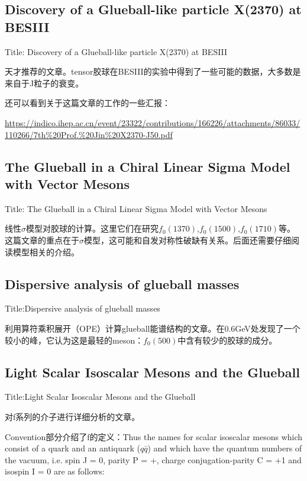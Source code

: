 \documentclass{article}
\begin{document}
\subsection{Discovery of a Glueball-like particle X(2370) at BESIII}

Title: Discovery of a Glueball-like particle X(2370) at BESIII \cite{huang2025discoveryglueballlikeparticlex2370}

天才推荐的文章。tensor胶球在BESIII的实验中得到了一些可能的数据，大多数是来自于J粒子的衰变。


还可以看到关于这篇文章的工作的一些汇报：

\url{https://indico.ihep.ac.cn/event/23322/contributions/166226/attachments/86033/110266/7th%20Prof.%20Jin%20X2370-J50.pdf}








\subsection{The Glueball in a Chiral Linear Sigma Model with Vector Mesons}

Title: The Glueball in a Chiral Linear Sigma Model with Vector Mesons \cite{Janowski_2011}

线性$\sigma$模型对胶球的计算。这里它们在研究$f_0(1370)$,$f_0(1500)$,$f_0(1710)$等。这篇文章的重点在于$\sigma$模型，这可能和自发对称性破缺有关系。后面还需要仔细阅读模型相关的介绍。


\subsection{Dispersive analysis of glueball masses}
Title:Dispersive analysis of glueball masses  \cite{li2021dispersive}

利用算符乘积展开（OPE）计算glueball能谱结构的文章。在0.6GeV处发现了一个较小的峰，它认为这是最轻的meson：$f_0(500)$中含有较少的胶球的成分。


\subsection{Light Scalar Isoscalar Mesons and the Glueball}

Title:Light Scalar Isoscalar Mesons and the Glueball \cite{10.1063/1.2130146}


对f系列的介子进行详细分析的文章。


Convention部分介绍了f的定义：Thus the names for scalar isoscalar
mesons which consist of a quark and an antiquark ($q \bar{q}$) and which have the quantum numbers of the vacuum, i.e. spin J = 0, parity P = +, charge conjugation-parity C = +1 and isospin I = 0 are as follows:
\end{document}
